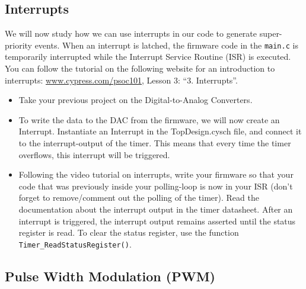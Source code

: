 \newpage
\subsection{Interrupts}

We will now study how we can use interrupts in our code to generate super-priority events. When an interrupt is latched, the firmware code in the \texttt{main.c} is temporarily interrupted while the Interrupt Service Routine (ISR) is executed. You can follow the tutorial on the following website for an introduction to interrupts: \url{www.cypress.com/psoc101}, Lesson 3: ``3. Interrupts''. 
\begin{itemize}
	\item Take your previous project on the Digital-to-Analog Converters.  
	\item To write the data to the DAC from the firmware, we will now create an Interrupt. Instantiate an Interrupt in the TopDesign.cysch file, and connect it to the interrupt-output of the timer. This means that every time the timer overflows, this interrupt will be triggered. 
	\item Following the video tutorial on interrupts, write your firmware so that your code that was previously inside your polling-loop is now in your ISR (don't forget to remove/comment out the polling of the timer). Read the documentation about the interrupt output in the timer datasheet. After an interrupt is triggered, the interrupt output remains asserted until the status register is read. To clear the status register, use the function \texttt{Timer\_ReadStatusRegister()}. 
\end{itemize}






\newpage
\subsection{Pulse Width Modulation (PWM)}

